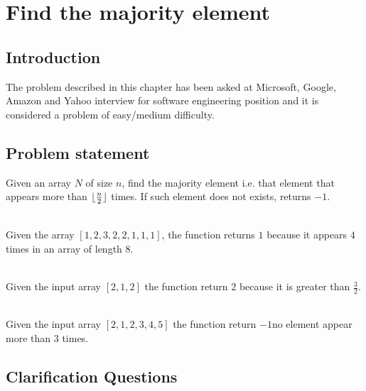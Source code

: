 %

\chapter{Find the majority element}
\label{ch:majority_element}
\section*{Introduction}
The problem described in this chapter has been asked at Microsoft, Google, Amazon and Yahoo interview for software engineering position and it is considered a problem of easy/medium difficulty.

\section{Problem statement}
\begin{exercise}
Given an array $N$ of size $n$, find the majority element i.e. that element that appears more than $\lfloor\frac{n}{2}\rfloor$ times.
If such element does not exists, returns $-1$.
	\begin{example}
		\hfill \\
		Given the array $[1,2,3,2,2,1,1,1]$, the function returns $1$ because it appears $4$ times in an array of length $8$.
	
	\end{example}

	\begin{example}
		\hfill \\
		Given the input array $[2, 1, 2]$ the function return $2$ because it is greater than $\frac{3}{2}$.
		
	\end{example}

	\begin{example}
		\hfill \\
		Given the input array $[2, 1, 2,3,4,5]$ the function return $-1$no element appear more than $3$ times.
		
	\end{example}

\end{exercise}

\section{Clarification Questions}

